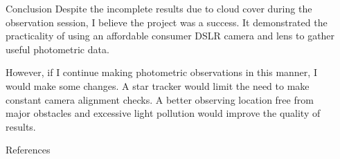 \documentclass[final]{beamer}
\newlength{\sepwidth}
\newlength{\colwidth}
\newcommand{\separatorcolumn}{\begin{column}{\sepwidth}\end{column}}
\begin{document}
\begin{frame}[t]
\begin{columns}[t]
\begin{column}{\colwidth}
  \begin{block}{Conclusion}
    Despite the incomplete results due to cloud cover during the observation
    session, I believe the project was a success. It demonstrated the practicality
    of using an affordable consumer DSLR camera and lens to gather useful photometric
    data.

    However, if I continue making photometric observations in this manner, I would make some
    changes. A star tracker would limit the need to make constant camera
    alignment checks. A better observing location free from major obstacles and excessive
    light pollution would improve the quality of results.
  \end{block}

  \begin{block}{References}

    \nocite{*}
    \printbibliography

  \end{block}

\end{column}

\separatorcolumn
\end{columns}
\end{frame}
\end{document}
